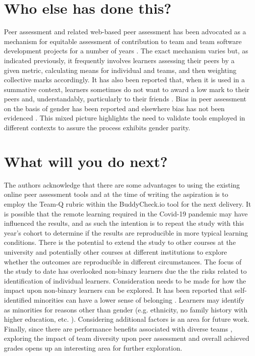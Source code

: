 \documentclass[sigconf, anonymous=true]{acmart}
\begin{document}
\section{Who else has done this?}
Peer assessment and related web-based peer assessment has been advocated as a mechanism for equitable assessment of contribution to team and team software development projects for a number of years \cite{Clark2005,Raban_Litchfield_2007, Gordon2010,Fagerholm, Britton2017,Philips21}. The exact mechanism varies but, as indicated previously, it frequently involves learners assessing their peers by a given metric, calculating means for individual and teams, and then weighting collective marks accordingly. It has also been reported that, when it is used in a summative context, learners sometimes do not want to award a low mark to their peers and, understandably, particularly to their friends \cite{Sridharam2003}.  Bias in peer assessment on the basis of gender has been reported \cite{Heels2019,Stonewall2018} and elsewhere bias has not been evidenced \cite{Tucker2014,Falchikov1997}. This mixed picture highlights the need to validate tools employed in different contexts to assure the process exhibits gender parity.

\section{What will you do next?}
The authors acknowledge that there are some advantages to using the existing online peer assessment tools and at the time of writing the aspiration is to employ the Team-Q rubric within the BuddyCheck.io tool for the next delivery. It is possible that the remote learning required in the Covid-19 pandemic may have influenced the results, and as such the intention is to repeat the study with this year's cohort to determine if the results are reproducible in more typical learning conditions. There is the potential to extend the study to other courses at the university and potentially other courses at different institutions to explore whether the outcomes are reproducible in different circumstances. The focus of the study to date has overlooked non-binary learners due the the risks related to identification of individual learners. Consideration needs to be made for how the impact upon non-binary learners can be explored. It has been reported that self-identified minorities can have a lower sense of belonging \cite{Mooney2020}. Learners may identify as minorities for reasons other than gender (e.g. ethnicity, no family history with higher education, etc. ). Considering additional factors is an area for future work. Finally, since there are performance benefits associated with diverse teams \cite{HBR206}, exploring the impact of team diversity upon peer assessment and overall achieved grades opens up an interesting area for further exploration.
\end{document}
